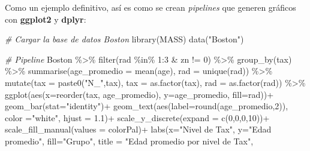 \documentclass[
]{article}
\newenvironment{Shaded}{\begin{snugshade}}{\end{snugshade}}
\newcommand{\AttributeTok}[1]{\textcolor[rgb]{0.77,0.63,0.00}{#1}}
\newcommand{\CommentTok}[1]{\textcolor[rgb]{0.56,0.35,0.01}{\textit{#1}}}
\newcommand{\DecValTok}[1]{\textcolor[rgb]{0.00,0.00,0.81}{#1}}
\newcommand{\FloatTok}[1]{\textcolor[rgb]{0.00,0.00,0.81}{#1}}
\newcommand{\FunctionTok}[1]{\textcolor[rgb]{0.00,0.00,0.00}{#1}}
\newcommand{\NormalTok}[1]{#1}
\newcommand{\SpecialCharTok}[1]{\textcolor[rgb]{0.00,0.00,0.00}{#1}}
\newcommand{\StringTok}[1]{\textcolor[rgb]{0.31,0.60,0.02}{#1}}
\theoremstyle{definition}
\theoremstyle{definition}
\theoremstyle{definition}
\theoremstyle{definition}
\theoremstyle{remark}
\begin{document}
Como un ejemplo definitivo, así es como se crean \emph{pipelines} que generen gráficos con \textbf{ggplot2} y \textbf{dplyr}:

\begin{Shaded}
\begin{Highlighting}[]
\CommentTok{\# Cargar la base de datos Boston}
\FunctionTok{library}\NormalTok{(MASS)}
\FunctionTok{data}\NormalTok{(}\StringTok{"Boston"}\NormalTok{)}

\CommentTok{\# Pipeline}
\NormalTok{Boston }\SpecialCharTok{\%\textgreater{}\%} 
  \FunctionTok{filter}\NormalTok{(rad }\SpecialCharTok{\%in\%} \DecValTok{1}\SpecialCharTok{:}\DecValTok{3} \SpecialCharTok{\&}\NormalTok{ zn }\SpecialCharTok{!=} \DecValTok{0}\NormalTok{) }\SpecialCharTok{\%\textgreater{}\%}
  \FunctionTok{group\_by}\NormalTok{(tax) }\SpecialCharTok{\%\textgreater{}\%} 
  \FunctionTok{summarise}\NormalTok{(}\AttributeTok{age\_promedio =} \FunctionTok{mean}\NormalTok{(age),}
            \AttributeTok{rad =} \FunctionTok{unique}\NormalTok{(rad)) }\SpecialCharTok{\%\textgreater{}\%} 
  \FunctionTok{mutate}\NormalTok{(}\AttributeTok{tax =} \FunctionTok{paste0}\NormalTok{(}\StringTok{"N\_"}\NormalTok{,tax),}
         \AttributeTok{tax =} \FunctionTok{as.factor}\NormalTok{(tax),}
         \AttributeTok{rad =} \FunctionTok{as.factor}\NormalTok{(rad)) }\SpecialCharTok{\%\textgreater{}\%} 
  \FunctionTok{ggplot}\NormalTok{(}\FunctionTok{aes}\NormalTok{(}\AttributeTok{x=}\FunctionTok{reorder}\NormalTok{(tax, age\_promedio), }\AttributeTok{y=}\NormalTok{age\_promedio, }\AttributeTok{fill=}\NormalTok{rad))}\SpecialCharTok{+}
  \FunctionTok{geom\_bar}\NormalTok{(}\AttributeTok{stat=}\StringTok{"identity"}\NormalTok{)}\SpecialCharTok{+}
  \FunctionTok{geom\_text}\NormalTok{(}\FunctionTok{aes}\NormalTok{(}\AttributeTok{label=}\FunctionTok{round}\NormalTok{(age\_promedio,}\DecValTok{2}\NormalTok{)), }\AttributeTok{color =}\StringTok{"white"}\NormalTok{,}
            \AttributeTok{hjust =} \FloatTok{1.1}\NormalTok{)}\SpecialCharTok{+}
  \FunctionTok{scale\_y\_discrete}\NormalTok{(}\AttributeTok{expand =} \FunctionTok{c}\NormalTok{(}\DecValTok{0}\NormalTok{,}\DecValTok{0}\NormalTok{,}\DecValTok{0}\NormalTok{,}\DecValTok{10}\NormalTok{))}\SpecialCharTok{+}
  \FunctionTok{scale\_fill\_manual}\NormalTok{(}\AttributeTok{values =}\NormalTok{ colorPal)}\SpecialCharTok{+}
  \FunctionTok{labs}\NormalTok{(}\AttributeTok{x=}\StringTok{"Nivel de Tax"}\NormalTok{, }\AttributeTok{y=}\StringTok{"Edad promedio"}\NormalTok{, }\AttributeTok{fill=}\StringTok{"Grupo"}\NormalTok{,}
       \AttributeTok{title =} \StringTok{"Edad promedio por nivel de Tax"}\NormalTok{,}

\end{Highlighting}
\end{Shaded}
\end{document}
